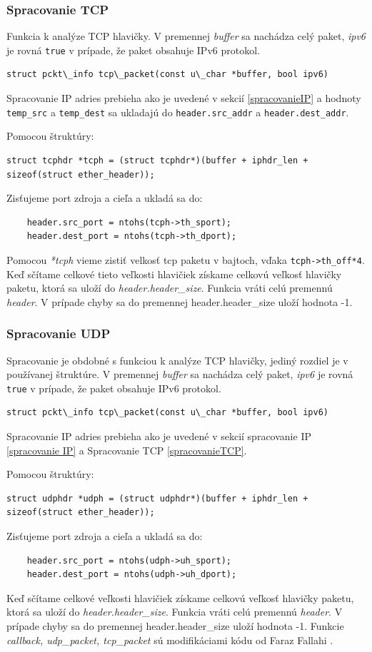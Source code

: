 \documentclass[11pt, a4paper]{article}
\begin{document}
	\subsubsection{Spracovanie TCP}
	Funkcia k analýze TCP hlavičky. V premennej \emph{buffer} sa nachádza celý paket, \emph{ipv6} je rovná \texttt{true} v prípade, že paket obsahuje IPv6 protokol. 
	\begin{lstlisting}
struct pckt\_info tcp\_packet(const u\_char *buffer, bool ipv6)
	\end{lstlisting}
	\label{spracovanieTCP}
	Spracovanie IP adries prebieha ako je uvedené v sekcií \ref{spracovanieIP} a hodnoty \texttt{temp\_src} a \texttt{temp\_dest} sa ukladajú do \texttt{header.src\_addr} a \texttt{header.dest\_addr}. 
	
	Pomocou štruktúry: 
	\begin{lstlisting}
struct tcphdr *tcph = (struct tcphdr*)(buffer + iphdr_len + sizeof(struct ether_header));
	\end{lstlisting}
Zisťujeme port zdroja a cieľa a ukladá sa do:
	\begin{lstlisting}
	header.src_port = ntohs(tcph->th_sport);
	header.dest_port = ntohs(tcph->th_dport);
	\end{lstlisting}
Pomocou \emph{*tcph} vieme zistiť velkosť tcp paketu v bajtoch, vďaka \texttt{tcph->th\_off*4}.
Keď sčítame celkové tieto veľkosti hlavičiek získame celkovú veľkosť hlavičky paketu, ktorá sa uloží do \emph{header.header\_size}. Funkcia vráti celú premennú \emph{header}. V prípade chyby sa do premennej header.header\_size uloží hodnota -1.

	\subsubsection{Spracovanie UDP}
	Spracovanie je obdobné s funkciou k analýze TCP hlavičky, jediný rozdiel je v používanej štruktúre. V premennej \emph{buffer} sa nachádza celý paket, \emph{ipv6} je rovná \texttt{true} v prípade, že paket obsahuje IPv6 protokol. 
	\begin{lstlisting}
struct pckt\_info tcp\_packet(const u\_char *buffer, bool ipv6)
	\end{lstlisting}
	Spracovanie IP adries prebieha ako je uvedené v sekcií spracovanie IP \ref{spracovanie IP} a Spracovanie TCP \ref{spracovanieTCP}.
	
	Pomocou štruktúry: 
	\begin{lstlisting}
struct udphdr *udph = (struct udphdr*)(buffer + iphdr_len + sizeof(struct ether_header));   
	\end{lstlisting}
Zisťujeme port zdroja a cieľa a ukladá sa do:
	\begin{lstlisting}
	header.src_port = ntohs(udph->uh_sport);
	header.dest_port = ntohs(udph->uh_dport);
	\end{lstlisting}
Keď sčítame celkové veľkosti hlavičiek získame celkovú veľkosť hlavičky paketu, ktorá sa uloží do \emph{header.header\_size}. Funkcia vráti celú premennú \emph{header}. V prípade chyby sa do premennej header.header\_size uloží hodnota -1. Funkcie \emph{callback, udp\_packet, tcp\_packet} sú modifikáciami kódu od Faraz Fallahi \cite{FarazFallahi}.
\end{document}
